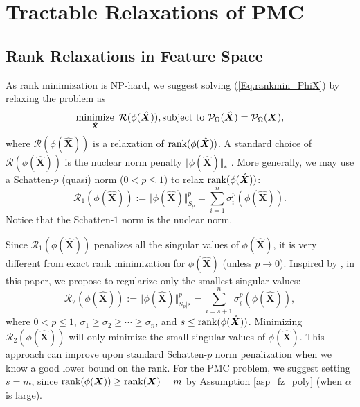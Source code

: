 \documentclass[letterpaper]{article} %
\begin{document}
\section{Tractable Relaxations of PMC}
\subsection{Rank Relaxations in Feature Space}
As rank minimization is NP-hard, we suggest solving (\ref{Eq.rankmin_PhiX}) by relaxing the problem as
\begin{equation}\label{Eq.rankmin_PhiX_relaxation}
\mathop{\text{minimize}}_{\hat{\bm{X}}}\ \mathcal{R}(\phi(\hat{\bm{X}})),
\textup{subject to}\ \mathcal{P}_{\Omega}(\hat{\bm{X}})=\mathcal{P}_{\Omega}(\bm{X}),
\end{equation}
where $\mathcal{R}(\phi(\hat{\bm{X}}))$ is a relaxation of $\textup{rank}(\phi(\hat{\bm{X}}))$.
A standard choice of $\mathcal{R}(\phi(\hat{\bm{X}}))$ is the nuclear norm penalty $\Vert \phi(\hat{\bm{X}})\Vert_\ast$ .
More generally,
we may use a Schatten-$p$ (quasi) norm ($0<p\leq 1$) \cite{Nie2015} to relax $\textup{rank}(\phi(\hat{\bm{X}}))$:
\begin{equation}
\mathcal{R}_1(\phi(\hat{\bm{X}})):=\Vert \phi(\hat{\bm{X}})\Vert_{S_p}^p=\sum_{i=1}^n\sigma_i^{p}(\phi(\hat{\bm{X}})).
\end{equation}
Notice that the Schatten-$1$ norm is the nuclear norm.


Since $\mathcal{R}_1(\phi(\hat{\bm{X}}))$ penalizes all the singular values of $\phi(\hat{\bm{X}})$, it is very different from exact rank minimization for $\phi(\hat{\bm{X}})$ (unless $p\rightarrow 0$). Inspired by \cite{MC_TNNR_PAMI2013,TIP_MC_TNNM}, in this paper, we propose to regularize only the smallest singular values:
\begin{equation}
\mathcal{R}_2(\phi(\hat{\bm{X}})):=\Vert \phi(\hat{\bm{X}})\Vert_{S_p\vert s}^p=\sum_{i=s+1}^n\sigma_i^{p}(\phi(\hat{\bm{X}})),
\end{equation}
where $0<p\leq 1$, $\sigma_1\geq\sigma_2\geq\cdots\geq\sigma_n$, and $s\leq \textup{rank}(\phi(\hat{\bm{X}}))$. Minimizing $\mathcal{R}_2(\phi(\hat{\bm{X}}))$ will only minimize the small singular values of $\phi(\hat{\bm{X}})$.
This approach can improve upon standard Schatten-$p$ norm penalization
when we know a good lower bound on the rank.
For the PMC problem,
we suggest setting $s=m$,
since $\textup{rank}(\phi(\bm{X}))\geq \textup{rank}(\bm{X})=m$ by Assumption \ref{asp_fz_poly} (when $\alpha$ is large).
\end{document}
